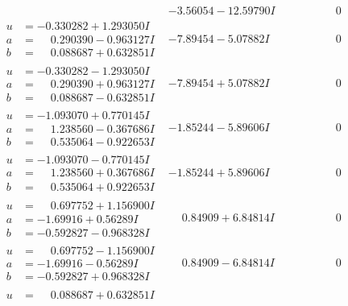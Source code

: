 \documentclass[1p]{elsarticle_modified}
\theoremstyle{definition}
\begin{document}
$$\begin{array}{c|c|c}
 & -3.56054 - 12.59790 I & \phantom{-0.000000 } 0 \\ \hline\begin{aligned}
u &= -0.330282 + 1.293050 I \\
a &= \phantom{-}0.290390 - 0.963127 I \\
b &= \phantom{-}0.088687 + 0.632851 I\end{aligned}
 & -7.89454 - 5.07882 I & \phantom{-0.000000 } 0 \\ \hline\begin{aligned}
u &= -0.330282 - 1.293050 I \\
a &= \phantom{-}0.290390 + 0.963127 I \\
b &= \phantom{-}0.088687 - 0.632851 I\end{aligned}
 & -7.89454 + 5.07882 I & \phantom{-0.000000 } 0 \\ \hline\begin{aligned}
u &= -1.093070 + 0.770145 I \\
a &= \phantom{-}1.238560 - 0.367686 I \\
b &= \phantom{-}0.535064 - 0.922653 I\end{aligned}
 & -1.85244 - 5.89606 I & \phantom{-0.000000 } 0 \\ \hline\begin{aligned}
u &= -1.093070 - 0.770145 I \\
a &= \phantom{-}1.238560 + 0.367686 I \\
b &= \phantom{-}0.535064 + 0.922653 I\end{aligned}
 & -1.85244 + 5.89606 I & \phantom{-0.000000 } 0 \\ \hline\begin{aligned}
u &= \phantom{-}0.697752 + 1.156900 I \\
a &= -1.69916 + 0.56289 I \\
b &= -0.592827 - 0.968328 I\end{aligned}
 & \phantom{-}0.84909 + 6.84814 I & \phantom{-0.000000 } 0 \\ \hline\begin{aligned}
u &= \phantom{-}0.697752 - 1.156900 I \\
a &= -1.69916 - 0.56289 I \\
b &= -0.592827 + 0.968328 I\end{aligned}
 & \phantom{-}0.84909 - 6.84814 I & \phantom{-0.000000 } 0 \\ \hline\begin{aligned}
u &= \phantom{-}0.088687 + 0.632851 I \\

\end{aligned}
\end{array}$$
\end{document}
